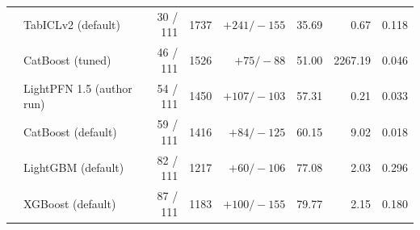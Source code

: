 \begin{tabular}{llrrrrrr}
 & TabICLv2 (default) & 30 / 111 & 1737 & $+241/-155$ & 35.69 & 0.67 & 0.118 \\
 & CatBoost (tuned) & 46 / 111 & 1526 & $+75/-88$ & 51.00 & 2267.19 & 0.046 \\
 & \cellcolor{orange!12}LightPFN 1.5 (author run) & \cellcolor{orange!12}54 / 111 & \cellcolor{orange!12}1450 & \cellcolor{orange!12}$+107/-103$ & \cellcolor{orange!12}57.31 & \cellcolor{orange!12}0.21 & \cellcolor{orange!12}0.033 \\
 & CatBoost (default) & 59 / 111 & 1416 & $+84/-125$ & 60.15 & 9.02 & 0.018 \\
 & LightGBM (default) & 82 / 111 & 1217 & $+60/-106$ & 77.08 & 2.03 & 0.296 \\
 & XGBoost (default) & 87 / 111 & 1183 & $+100/-155$ & 79.77 & 2.15 & 0.180 \\
\bottomrule
\end{tabular}
